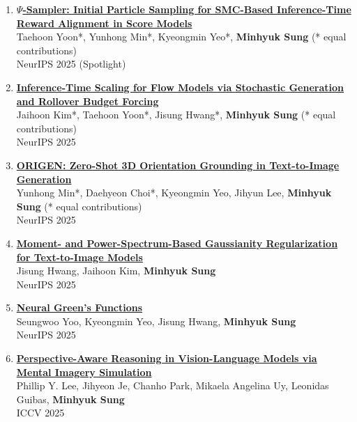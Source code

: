 \documentclass[letterpaper,10pt]{article} %
\newcommand{\blankline}{\quad\pagebreak[2]}
\begin{document}
\begin{enumerate}
\item \label{neurips25_5}
\href{https://arxiv.org/abs/2506.01320}{\textbf{$\Psi$-Sampler: Initial Particle Sampling for SMC-Based Inference-Time Reward Alignment in Score Models}}\\
Taehoon Yoon*, Yunhong Min*, Kyeongmin Yeo*, \textbf{Minhyuk Sung} (* equal contributions)\\
NeurIPS 2025 (Spotlight)\\
\blankline

\item \label{neurips25_4}
\href{https://arxiv.org/abs/2503.19385}{\textbf{Inference-Time Scaling for Flow Models via Stochastic Generation and Rollover Budget Forcing}}\\
Jaihoon Kim*, Taehoon Yoon*, Jisung Hwang*, \textbf{Minhyuk Sung} (* equal contributions)\\
NeurIPS 2025\\
\blankline

\item \label{neurips25_3}
\href{https://arxiv.org/abs/2503.22194}{\textbf{ORIGEN: Zero-Shot 3D Orientation Grounding in Text-to-Image Generation}}\\
Yunhong Min*, Daehyeon Choi*, Kyeongmin Yeo, Jihyun Lee, \textbf{Minhyuk Sung} (* equal contributions)\\
NeurIPS 2025\\
\blankline

\item \label{neurips25_2}
\href{https://arxiv.org/abs/2509.07027}{\textbf{Moment- and Power-Spectrum-Based Gaussianity Regularization for Text-to-Image Models}}\\
Jisung Hwang, Jaihoon Kim, \textbf{Minhyuk Sung}\\
NeurIPS 2025\\
\blankline

\item \label{neurips25_1}
\href{https://arxiv.org/abs/2511.01924}{\textbf{Neural Green’s Functions}}\\
Seungwoo Yoo, Kyeongmin Yeo, Jisung Hwang, \textbf{Minhyuk Sung}\\
NeurIPS 2025\\
\blankline

\item \label{iccv25}
\href{https://arxiv.org/abs/2504.17207}{\textbf{Perspective-Aware Reasoning in Vision-Language Models via Mental Imagery Simulation}}\\
Phillip Y. Lee, Jihyeon Je, Chanho Park, Mikaela Angelina Uy, Leonidas Guibas, \textbf{Minhyuk Sung}\\
ICCV 2025\\
\blankline


\end{enumerate}
\end{document}
